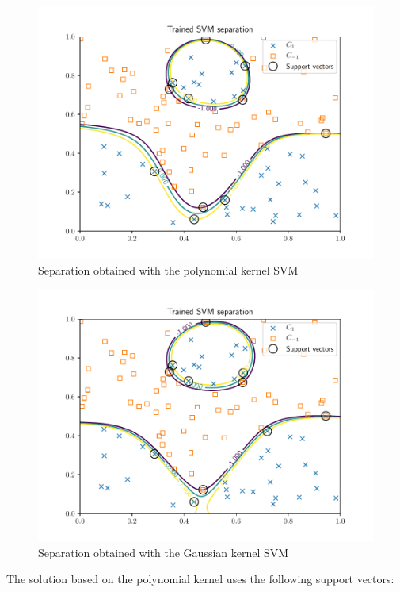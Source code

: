 \documentclass[letterpaper,headings=standardclasses]{scrartcl}
\begin{document}
\begin{figure}[h]
    \centering
    \includegraphics[width=0.7\linewidth]{sep_poly.pdf}
    \caption{Separation obtained with the polynomial kernel SVM}
    \label{sep_poly}
\end{figure}

\begin{figure}[h]
    \centering
    \includegraphics[width=0.7\linewidth]{sep_exp.pdf}
    \caption{Separation obtained with the Gaussian kernel SVM}
    \label{sep_exp}
\end{figure}

The solution based on the polynomial kernel uses the following support vectors:
\end{document}
